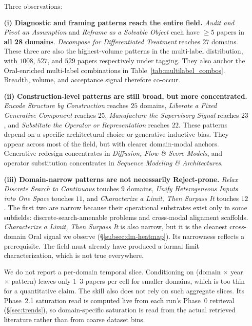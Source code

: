 \documentclass[10pt,a4paper]{article}
\begin{document}
Three observations:

\textbf{(i) Diagnostic and framing patterns reach the entire field.} \emph{Audit and Pivot an Assumption} and \emph{Reframe as a Solvable Object} each have $\geq 5$ papers in \textbf{all 28 domains}. \emph{Decompose for Differentiated Treatment} reaches 27 domains. These three are also the highest-volume patterns in the multi-label distribution, with $1008$, $527$, and $529$ papers respectively under tagging. They also anchor the Oral-enriched multi-label combinations in Table~\ref{tab:multilabel_combos}. Breadth, volume, and acceptance signal therefore co-occur.

\textbf{(ii) Construction-level patterns are still broad, but more concentrated.} \emph{Encode Structure by Construction} reaches $25$ domains, \emph{Liberate a Fixed Generative Component} reaches $25$, \emph{Manufacture the Supervisory Signal} reaches $23$, and \emph{Substitute the Operator or Representation} reaches $22$. These patterns depend on a specific architectural choice or generative inductive bias. They appear across most of the field, but with clearer domain-modal anchors. Generative redesign concentrates in \textit{Diffusion, Flow \& Score Models}, and operator substitution concentrates in \textit{Sequence Modeling \& Architectures}.

\textbf{(iii) Domain-narrow patterns are not necessarily Reject-prone.} \emph{Relax Discrete Search to Continuous} touches $9$ domains, \emph{Unify Heterogeneous Inputs into One Space} touches $11$, and \emph{Characterize a Limit, Then Surpass It} touches $12$. The first two are narrow because their operational substrates exist only in some subfields: discrete-search-amenable problems and cross-modal alignment scaffolds. \emph{Characterize a Limit, Then Surpass It} is also narrow, but it is the cleanest cross-domain Oral signal we observe (\S\ref{subsec:dm-heatmap}). Its narrowness reflects a prerequisite. The field must already have produced a formal limit characterization, which is not true everywhere.

We do not report a per-domain temporal slice. Conditioning on (domain $\times$ year $\times$ pattern) leaves only 1--3 papers per cell for smaller domains, which is too thin for a quantitative claim. The skill also does not rely on such aggregate slices. Its Phase~2.1 saturation read is computed live from each run's Phase~0 retrieval (\S\ref{sec:trends}), so domain-specific saturation is read from the actual retrieved literature rather than from coarse dataset bins.
\end{document}
